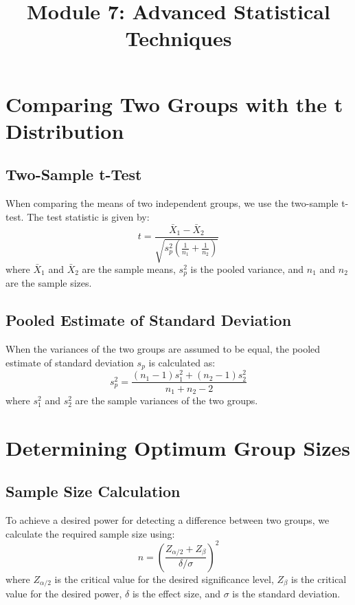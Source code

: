 \documentclass{article}
\title{Module 7: Advanced Statistical Techniques}
\author{}
\date{}
\begin{document}
\maketitle

\section{Comparing Two Groups with the t Distribution}

\subsection{Two-Sample t-Test}
When comparing the means of two independent groups, we use the two-sample t-test. The test statistic is given by:
\begin{equation}
t = \frac{\bar{X}_1 - \bar{X}_2}{\sqrt{s_p^2 \left(\frac{1}{n_1} + \frac{1}{n_2}\right)}}
\end{equation}
where $\bar{X}_1$ and $\bar{X}_2$ are the sample means, $s_p^2$ is the pooled variance, and $n_1$ and $n_2$ are the sample sizes.

\subsection{Pooled Estimate of Standard Deviation}
When the variances of the two groups are assumed to be equal, the pooled estimate of standard deviation $s_p$ is calculated as:
\begin{equation}
s_p^2 = \frac{(n_1 - 1)s_1^2 + (n_2 - 1)s_2^2}{n_1 + n_2 - 2}
\end{equation}
where $s_1^2$ and $s_2^2$ are the sample variances of the two groups.

\section{Determining Optimum Group Sizes}

\subsection{Sample Size Calculation}
To achieve a desired power for detecting a difference between two groups, we calculate the required sample size using:
\begin{equation}
n = \left(\frac{Z_{\alpha/2} + Z_{\beta}}{\delta / \sigma}\right)^2
\end{equation}
where $Z_{\alpha/2}$ is the critical value for the desired significance level, $Z_{\beta}$ is the critical value for the desired power, $\delta$ is the effect size, and $\sigma$ is the standard deviation.
\end{document}
